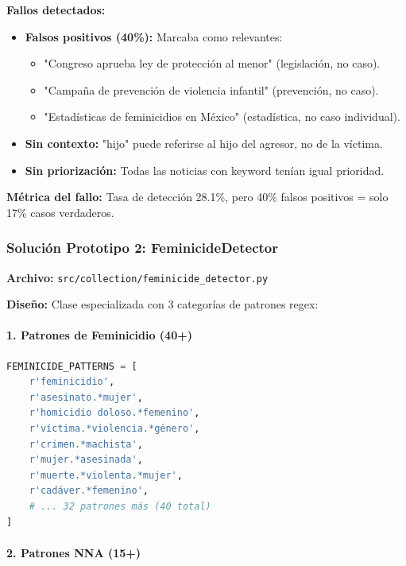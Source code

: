\textbf{Fallos detectados:}
\begin{itemize}
    \item \textbf{Falsos positivos (40\%):} Marcaba como relevantes:
    \begin{itemize}
        \item "Congreso aprueba ley de protección al menor" (legislación, no caso).
        \item "Campaña de prevención de violencia infantil" (prevención, no caso).
        \item "Estadísticas de feminicidios en México" (estadística, no caso individual).
    \end{itemize}
    \item \textbf{Sin contexto:} "hijo" puede referirse al hijo del agresor, no de la víctima.
    \item \textbf{Sin priorización:} Todas las noticias con keyword tenían igual prioridad.
\end{itemize}

\textbf{Métrica del fallo:} Tasa de detección 28.1\%, pero 40\% falsos positivos = solo 17\% casos verdaderos.

\subsubsection{Solución Prototipo 2: FeminicideDetector}

\textbf{Archivo:} \texttt{src/collection/feminicide\_detector.py}

\textbf{Diseño:} Clase especializada con 3 categorías de patrones regex:

\paragraph{1. Patrones de Feminicidio (40+)}

\begin{lstlisting}[language=Python, caption={Ejemplos de patrones de feminicidio}]
FEMINICIDE_PATTERNS = [
    r'feminicidio',
    r'asesinato.*mujer',
    r'homicidio doloso.*femenino',
    r'víctima.*violencia.*género',
    r'crimen.*machista',
    r'mujer.*asesinada',
    r'muerte.*violenta.*mujer',
    r'cadáver.*femenino',
    # ... 32 patrones más (40 total)
]
\end{lstlisting}

\paragraph{2. Patrones NNA (15+)}

